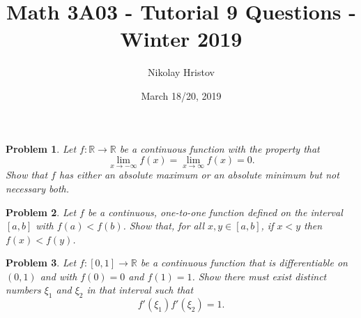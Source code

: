 \documentclass[11pt]{article}
\theoremstyle{plain}
\newtheorem{problem}{Problem}
\theoremstyle{remark}
\newcommand {\mbR} {\mathbb R}
\begin{document}
	\title{Math 3A03 - Tutorial 9 Questions - Winter 2019}
	\author{Nikolay Hristov}
	\date{March 18/20, 2019}
	\maketitle
	

\begin{problem}
	Let $f:\mbR \to \mbR$ be a continuous function with the property that 
	\begin{equation}
	\label{limits}
	\lim_{x\to -\infty} f(x) = \lim_{x\to \infty} f(x) = 0.
	\end{equation}
	Show that $f$ has either an absolute maximum or an absolute minimum but not necessary both.
\end{problem}



	\begin{problem}
	Let $f$ be a continuous, one-to-one function defined on the interval $[a,b]$ with $f(a)<f(b)$. Show that, for all $x,y \in [a,b]$, if $x<y$ then $f(x)<f(y)$.
\end{problem}


\begin{problem}
	Let $f:[0,1] \to \mbR$ be a continuous function that is differentiable on 
	$(0,1)$ and with $f(0)=0$ and $f(1)=1$. Show there must exist distinct numbers $\xi_1$ and $\xi_2$ in that interval such that 
	$$
	f'(\xi_1)f'(\xi_2)=1.
	$$
\end{problem}
	
\end{document}
